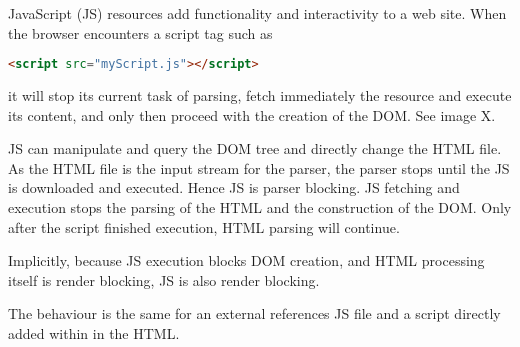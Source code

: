 
JavaScript (JS) resources add functionality and interactivity to a web site.
When the browser encounters a script tag such as

\begin{lstlisting}[language=html, numbers=none]
<script src="myScript.js"></script>
\end{lstlisting}

it will stop its current task of parsing, fetch immediately the resource and execute its content, and only then proceed with the creation of the DOM. %
See image X.

JS can manipulate and query the DOM tree and directly change the HTML file.
As the HTML file is the input stream for the parser,  the parser stops until the JS is downloaded and executed. %
Hence JS is parser blocking.
JS fetching and execution stops the parsing of the HTML and the construction of the DOM.
Only after the script finished execution, HTML parsing will continue.

Implicitly, because JS execution blocks DOM creation, and HTML processing itself is render blocking, JS is also render blocking. %


The behaviour is the same for an external references JS file and a script directly added within in the HTML.







